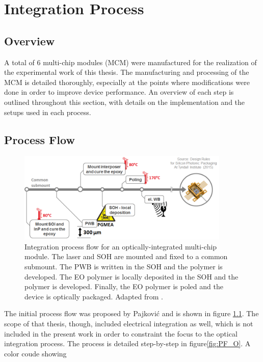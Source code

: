 

\chapter{Integration Process}
\label{ch:ew}

\section{Overview}
A total of 6 multi-chip modules (MCM) were manufactured for the realization of the experimental work of this thesis. The manufacturing and processing of the MCM is detailed thoroughly, especially at the points where modifications were done in order to improve device performance. An overview of each step is outlined throughout this section, with details on the implementation and the setups used in each process. 

\section{Process Flow}

\begin{figure}[!ht]
  \centering
  \includegraphics[width=0.9\textwidth]{visio/ProcessFlow_Rastko}
  \caption{Integration process flow for an optically-integrated multi-chip module. The laser and SOH are mounted and fixed to a common submount. The PWB is written in the SOH and the polymer is developed. The EO polymer is locally deposited in the SOH and the polymer is developed. Finally, the EO polymer is poled and the device is optically packaged.  Adapted from \cite{SOHPajkovic16}.}
  \label{fig:PF_R}
\end{figure}

The initial process flow was proposed by Pajkovi{ć} \cite{SOHPajkovic16} and is shown in figure \ref{fig:PF_R}. The scope of that thesis, though, included electrical integration as well, which is not included in the present work in order to constraint the focus to the optical integration process. The process is detailed step-by-step in figure\ref{fig:PF_O}. A color coude showing 

